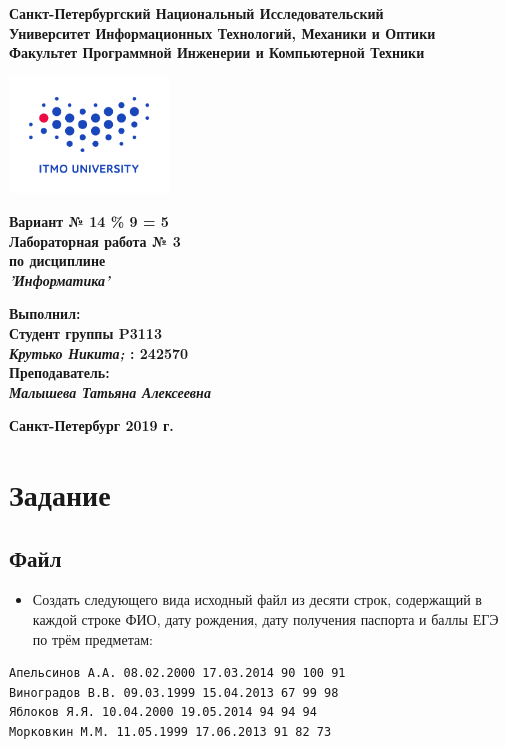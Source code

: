 \documentclass[11pt]{article}
\author{Krutko Nikita / KrutNA}
\date{\today}
\title{}
\begin{document}
\large
\thispagestyle{empty}
\begin{center}
\textbf{Санкт-Петербургский Национальный Исследовательский}\\
\textbf{Университет Информационных Технологий, Механики и Оптики}\\
\textbf{Факультет Программной Инженерии и Компьютерной Техники}\\
\end{center}
\vspace{1em}
\begin{center}
\includegraphics[width=120pt]{../itmo-logo.png}
\end{center}
\LARGE
\vspace{5em}
\begin{center}
\textbf{Вариант № 14 \% 9 = 5}\\
\textbf{Лабораторная работа № 3}\\
\Large
\textbf{по дисциплине}\\
\LARGE
\textbf{\emph{'Информатика'}}\\
\end{center}
\vspace{11em}
\large
\begin{flushright}
\textbf{Выполнил:}\\
\textbf{Студент группы P3113}\\
\textbf{\emph{Крутько Никита;} : 242570}\\
\textbf{Преподаватель:}\\
\textbf{\emph{Малышева Татьяна Алексеевна}}\\
\end{flushright}
\vspace{4em}
\large
\begin{center}
\textbf{Санкт-Петербург 2019 г.}
\end{center}
\pagebreak{}
\setcounter{tocdepth}{2}
\tableofcontents
\normalsize
\section{Задание}
\label{sec:org4651993}
\subsection{Файл}
\label{sec:orgc1032d0}
\begin{itemize}
\item Создать следующего вида исходный файл из десяти строк, содержащий в каждой строке ФИО, дату рождения, дату получения паспорта и баллы ЕГЭ по трём предметам:
\end{itemize}
\scriptsize
\begin{verbatim}
Апельсинов А.А. 08.02.2000 17.03.2014 90 100 91
Виноградов В.В. 09.03.1999 15.04.2013 67 99 98
Яблоков Я.Я. 10.04.2000 19.05.2014 94 94 94
Морковкин М.М. 11.05.1999 17.06.2013 91 82 73
\end{verbatim}
\end{document}
